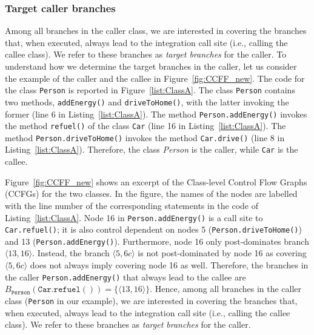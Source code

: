 \subsubsection{Target caller branches}
Among all branches in the caller class, we are interested in covering the branches that, when executed, always lead to the integration call site (i.e., calling the callee class). We refer to these branches as \textit{target branches} for the caller.
To understand how we determine the target branches in the caller, 
let us consider the example of the caller and the callee in Figure~\ref{fig:CCFF_new}. The code for the class \texttt{Person} is reported in Figure~\ref{list:ClassA}. The class \texttt{Person} contains two methods, \texttt{addEnergy()} and \texttt{driveToHome()}, with the latter invoking the former (line 6 in Listing~\ref{list:ClassA}). The method \texttt{Person.addEnergy()} invokes the method \texttt{refuel()} of the class \texttt{Car} (line 16 in Listing~\ref{list:ClassA}). The method \texttt{Person.driveToHome()} invokes the method \texttt{Car.drive()} (line 8 in Listing~\ref{list:ClassA}). Therefore, the class \textit{Person} is the caller, while \texttt{Car} is the callee. 

Figure~\ref{fig:CCFF_new} shows an excerpt of the Class-level Control Flow Graphs (CCFGs) for the two classes. In the figure, the names of the nodes are labelled with the line number of the corresponding statements in the code of Listing~\ref{list:ClassA}. Node 16 in \texttt{Person.addEnergy()} is a call site to \texttt{Car.refuel()}; it is also control dependent on nodes 5 (\texttt{Person.driveToHome()}) and 13 (\texttt{Person.addEnergy()}). Furthermore, node 16 only post-dominates branch $\langle 13,16\rangle$. Instead, the branch $\langle 5,6c\rangle$ is not post-dominated by  node 16 as covering $\langle 5,6c\rangle$ does not always imply covering node 16 as well. Therefore, the branches in the caller \texttt{Person.addEner\-gy()} that always lead to the callee are $B_{\mathtt{Person}}(\mathtt{Car.refuel()})=\{\langle 13,16\rangle\}$. 
Hence, among all branches in the caller class (\texttt{Person} in our example), we are interested in covering the branches that, when executed, always lead to the integration call site (i.e., calling the callee class). We refer to these branches as \textit{target branches} for the caller.
 
